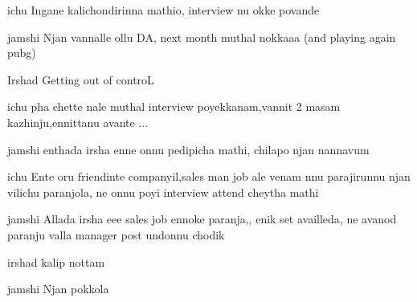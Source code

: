 \documentclass{screenplay}[2012/06/30]
\begin{document}
\begin{dialogue}{ichu}
Ingane kalichondirinna mathio, interview nu okke povande
\end{dialogue}

\begin{dialogue}{jamshi}
Njan vannalle ollu DA, next month muthal nokkaaa (and playing again pubg)
\end{dialogue}

Irshad Getting out of controL
\begin{dialogue}{ichu}
pha chette nale muthal interview poyekkanam,vannit 2 masam kazhinju,ennittanu avante ...
\end{dialogue}
\begin{dialogue}{jamshi}
enthada irsha enne onnu pedipicha mathi, chilapo njan nannavum
\end{dialogue}
\begin{dialogue}{ichu}
Ente oru friendinte companyil,sales man job ale venam nnu parajirunnu njan vilichu paranjola, ne onnu poyi interview attend cheytha mathi
\end{dialogue}

\begin{dialogue}{jamshi}
Allada irsha eee sales job ennoke paranja,, enik set availleda, ne avanod paranju valla manager post undonnu chodik
\end{dialogue}
irshad kalip nottam

\begin{dialogue}{jamshi}
Njan pokkola
\end{dialogue}
















\fadeout

\theend
\end{document}
